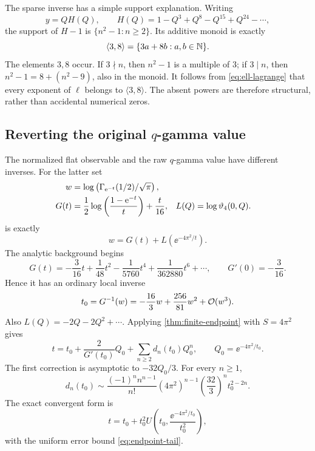 The sparse inverse has a simple support explanation.
Writing
\[
 y=QH(Q),\qquad
 H(Q)=1-Q^3+Q^8-Q^{15}+Q^{24}-\cdots ,
\]
the support of \(H-1\) is \(\{n^2-1:n\ge2\}\).
Its additive monoid is exactly
\[
 \langle3,8\rangle=\{3a+8b:a,b\in\mathbb N\}.
\]
The elements \(3,8\) occur.  If \(3\nmid n\), then \(n^2-1\)
is a multiple of \(3\); if \(3\mid n\), then
\(n^2-1=8+(n^2-9)\), also in the monoid.
It follows from \cref{eq:ell-lagrange} that every exponent of
\(\ell\) belongs to \(\langle3,8\rangle\).
The absent powers are therefore structural, rather than
accidental numerical zeros.

\subsection{Reverting the original \texorpdfstring{\(q\)}{q}-gamma value}

The normalized flat observable and the raw \(q\)-gamma value
have different inverses.
For the latter set
\begin{align}
 w&=\log\left(\Gamma_{\mathrm e^{-t}}(1/2)/\sqrt{\pi}\right),\notag\\
 G(t)&=\frac12\log\left(\frac{1-\mathrm e^{-t}}t\right)+\frac{t}{16},
 &L(Q)&=\log\vartheta_4(0,Q).
 \label{eq:raw-gamma-log}
\end{align}
 is exactly
\[
 w=G(t)+L(\ee^{-4\pi^2/t}).
\]
The analytic background begins
\begin{equation}\label{eq:gamma-background}
 G(t)=-\frac{3}{16}t+\frac1{48}t^2
       -\frac1{5760}t^4+\frac1{362880}t^6+\cdots ,
 \qquad G'(0)=-\frac3{16}.
\end{equation}
Hence it has an ordinary local inverse
\[
 t_0=G^{-1}(w)=-\frac{16}{3}w+\frac{256}{81}w^2
                 +\mathcal O(w^3).
\]
Also \(L(Q)=-2Q-2Q^2+\cdots\).
Applying \cref{thm:finite-endpoint} with \(S=4\pi^2\) gives
\begin{equation}\label{eq:raw-gamma-inverse}
 t=t_0+\frac{2}{G'(t_0)}Q_0
       +\sum_{n\ge2}d_n(t_0)Q_0^n,\qquad
 Q_0=\ee^{-4\pi^2/t_0}.
\end{equation}
The first correction is asymptotic to \(-32Q_0/3\).
For every \(n\ge1\),
\begin{equation}\label{eq:gamma-leading-poles}
 d_n(t_0)\sim
 \frac{(-1)^n n^{n-1}}{n!}
 (4\pi^2)^{n-1}\left(\frac{32}{3}\right)^n
 t_0^{2-2n}.
\end{equation}
The exact convergent form is
\[
 t=t_0+t_0^2U\left(t_0,\frac{\ee^{-4\pi^2/t_0}}{t_0^2}\right),
\]
with the uniform error bound \cref{eq:endpoint-tail}.

